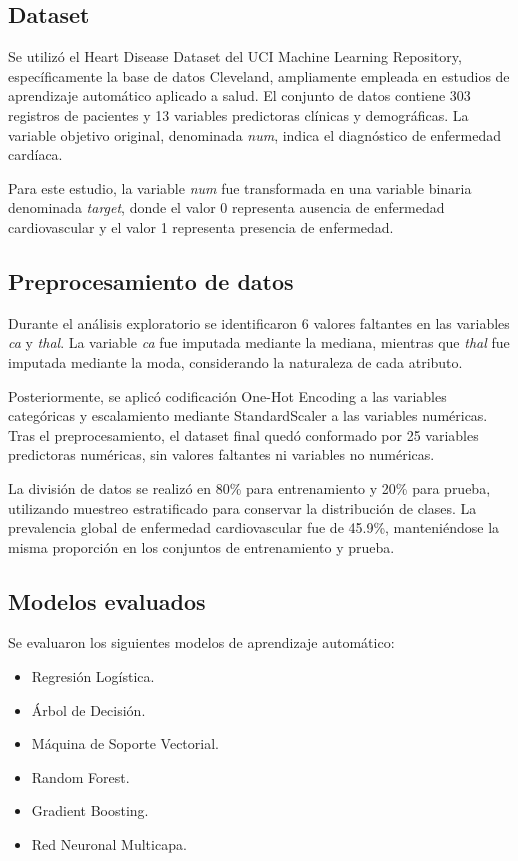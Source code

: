 \documentclass[conference]{IEEEtran}
\begin{document}
\subsection{Dataset}

Se utilizó el Heart Disease Dataset del UCI Machine Learning Repository, específicamente la base de datos Cleveland, ampliamente empleada en estudios de aprendizaje automático aplicado a salud. El conjunto de datos contiene 303 registros de pacientes y 13 variables predictoras clínicas y demográficas. La variable objetivo original, denominada \textit{num}, indica el diagnóstico de enfermedad cardíaca.

Para este estudio, la variable \textit{num} fue transformada en una variable binaria denominada \textit{target}, donde el valor 0 representa ausencia de enfermedad cardiovascular y el valor 1 representa presencia de enfermedad.

\subsection{Preprocesamiento de datos}

Durante el análisis exploratorio se identificaron 6 valores faltantes en las variables \textit{ca} y \textit{thal}. La variable \textit{ca} fue imputada mediante la mediana, mientras que \textit{thal} fue imputada mediante la moda, considerando la naturaleza de cada atributo.

Posteriormente, se aplicó codificación One-Hot Encoding a las variables categóricas y escalamiento mediante StandardScaler a las variables numéricas. Tras el preprocesamiento, el dataset final quedó conformado por 25 variables predictoras numéricas, sin valores faltantes ni variables no numéricas.

La división de datos se realizó en 80\% para entrenamiento y 20\% para prueba, utilizando muestreo estratificado para conservar la distribución de clases. La prevalencia global de enfermedad cardiovascular fue de 45.9\%, manteniéndose la misma proporción en los conjuntos de entrenamiento y prueba.

\subsection{Modelos evaluados}

Se evaluaron los siguientes modelos de aprendizaje automático:

\begin{itemize}
    \item Regresión Logística.
    \item Árbol de Decisión.
    \item Máquina de Soporte Vectorial.
    \item Random Forest.
    \item Gradient Boosting.
    \item Red Neuronal Multicapa.
\end{itemize}
\end{document}
